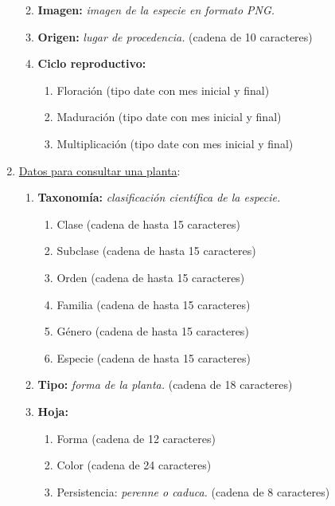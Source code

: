 \documentclass[10pt,a4paper]{article}
\begin{document}
\begin{enumerate}[label={RD\arabic*.} ,leftmargin=2.8\parindent]
\begin{enumerate}[label={RD9.\arabic*.}]
	\medskip	
	\item
		\textbf{Imagen:} \textit{imagen de la especie en formato PNG.}

	\medskip 
	\item
		\textbf{Origen:} \textit{lugar de procedencia.} (cadena de 10 caracteres)
		
	\medskip 
	\item
		\textbf{Ciclo reproductivo:}
	\begin{enumerate} [label=-]
		\item Floración (tipo date con mes inicial y final)
		\item Maduración (tipo date con mes inicial y final)
		\item Multiplicación (tipo date con mes inicial y final)
	\end{enumerate}
	\medskip \medskip
		\end{enumerate}
	
 	\item \underline{Datos para consultar una planta}:
	\begin{enumerate}[label={RD10.\arabic*.}]
	
	\item 
		\textbf{Taxonomía:} \textit{clasificación científica de la especie.}
	\begin{enumerate}[label=-]
		\item Clase (cadena de hasta 15 caracteres)
		\item Subclase (cadena de hasta 15 caracteres)
		\item Orden (cadena de hasta 15 caracteres)
		\item Familia (cadena de hasta 15 caracteres)
		\item Género (cadena de hasta 15 caracteres)
		\item Especie (cadena de hasta 15 caracteres)
	\end{enumerate}
	\medskip
	
	\item 
		\textbf{Tipo:} \textit{forma de la planta.} (cadena de 18 caracteres)

	\medskip
	\item
		\textbf{Hoja:}
	\begin{enumerate}[label=-]
		\item Forma (cadena de 12 caracteres)
		\item Color (cadena de 24 caracteres)
		\item Persistencia: \textit{perenne o caduca.} (cadena de 8 caracteres)
	\end{enumerate}


\end{enumerate}
\end{enumerate}
\end{document}
